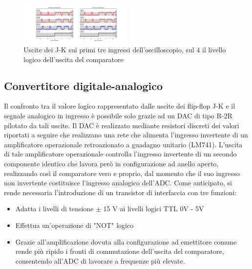 \documentclass[journal]{IEEEtran}
\begin{document}
\begin{figure}[H]%
\begin{center}
\includegraphics[trim = {570 0 0 0}, clip, width=0.50\textwidth]{analysis/output/cumulative_BIT_with_transistor.pdf}
\caption{Uscite dei J-K sui primi tre ingressi dell'oscilloscopio, sul 4 il livello logico dell'uscita del comparatore}
\label{fig:BIT_with_transistor}
\end{center}
\end{figure}

\subsection{Convertitore digitale-analogico}
Il confronto tra il valore logico rappresentato dalle uscite dei flip-flop J-K e il segnale analogico in ingresso è possibile solo grazie ad un DAC di tipo R-2R pilotato da tali uscite. Il DAC è realizzato mediante resistori discreti dei valori riportati a seguire che realizzano una rete che alimenta l'ingresso invertente di un amplificatore operazionale retroazionato a guadagno unitario (LM741). L'uscita di tale amplificatore operazionale controlla l'ingresso invertente di un secondo componente identico che lavora però in configurazione ad anello aperto, realizzando così il comparatore vero e proprio, dal momento che il suo ingresso non invertente costituisce l'ingresso analogico dell'ADC. Come anticipato, si rende necessaria l'introduzione di un transistor di interfaccia con tre funzioni:
\begin{itemize}
    \item Adatta i livelli di tensione $\pm$ 15 V ai livelli logici TTL 0V - 5V
    \item Effettua un'operazione di "NOT" logico
    \item Grazie all'amplificazione dovuta alla configurazione ad emettitore comune rende più ripido i fronti di commutazione dell'uscita del comparatore, consentendo all'ADC di lavorare a frequenze più elevate.
\end{itemize}
\end{document}
